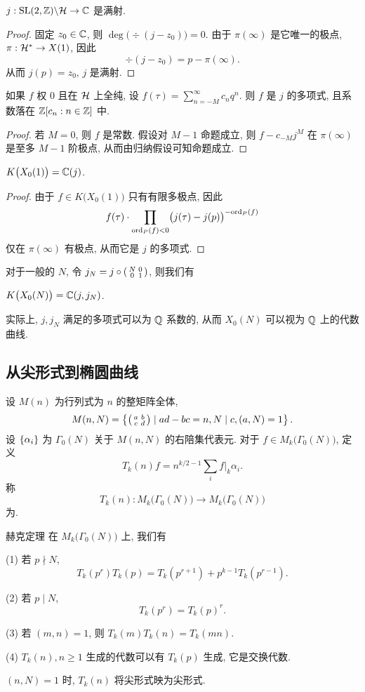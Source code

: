 \begin{proposition}{}{}
$j:{\mathrm{SL}}(2,{\mathbb{Z}})\backslash {\mathcal{H}}\to {\mathbb{C}}$ 是满射.
\end{proposition}
\begin{proof}
固定 $z_0\in{\mathbb{C}}$, 则 $\deg\bigl(\div(j-z_0)\bigr)=0$. 由于 $\pi(\infty)$ 是它唯一的极点, $\pi:{\mathcal{H}}^*\to X(1)$, 因此
  \[\div(j-z_0)=p-\pi(\infty).\]
从而 $j(p)=z_0$, $j$ 是满射.
\end{proof}

\begin{lemma}{}{}
如果 $f$ 权 $0$ 且在 ${\mathcal{H}}$ 上全纯, 设 $f(\tau)=\sum_{n=-M}^\infty c_nq^n$. 则 $f$ 是 $j$ 的多项式, 且系数落在 ${\mathbb{Z}}[c_n:n\in{\mathbb{Z}}]$ 中. 
\end{lemma}
\begin{proof}
若 $M=0$, 则 $f$ 是常数. 假设对 $M-1$ 命题成立, 则 $f-c_{-M}j^M$ 在 $\pi(\infty)$ 是至多 $M-1$ 阶极点, 从而由归纳假设可知命题成立.
\end{proof}

\begin{theorem}{}{}
$K\bigl(X_0(1)\bigr)={\mathbb{C}}(j)$.
\end{theorem}
\begin{proof}
由于 $f\in K\bigl(X_0(1)\bigr)$ 只有有限多极点, 因此
  \[f(\tau)\cdot \prod_{{\mathrm{ord}}_P(f)<0}\bigl(j(\tau)-j(p)\bigr)^{-{\mathrm{ord}}_P(f)}\]
仅在 $\pi(\infty)$ 有极点, 从而它是 $j$ 的多项式.
\end{proof}

对于一般的 $N$, 令 $j_N=j\circ \left(\begin{smallmatrix}N & 0 \\ 0 & 1\end{smallmatrix}\right)$, 则我们有
\begin{theorem}{}{}
$K\bigl(X_0(N)\bigr)={\mathbb{C}}(j,j_N)$.
\end{theorem}
实际上, $j,j_N$ 满足的多项式可以为 ${\mathbb{Q}}$ 系数的, 从而 $X_0(N)$ 可以视为 ${\mathbb{Q}}$ 上的代数曲线.


\subsection{从尖形式到椭圆曲线}
设 $M(n)$ 为行列式为 $n$ 的整矩阵全体, 
  \[M(n,N)=\left\{\left(\begin{smallmatrix}a & b \\ c & d\end{smallmatrix}\right)\mid ad-bc=n,N\mid c,(a,N)=1\right\}.\]
设 $\left\{\alpha_i\right\}$ 为 $\Gamma_0(N)$ 关于 $M(n,N)$ 的右陪集代表元. 对于 $f\in M_k\bigl(\Gamma_0(N)\bigr)$, 定义
  \[T_k(n)f=n^{k/2-1}\sum_i f|_k \alpha_i.\]
称
  \[T_k(n):M_k\bigl(\Gamma_0(N)\bigr)\to M_k\bigl(\Gamma_0(N)\bigr)\]
为.

\begin{theorem}{赫克定理}{}
在 $M_k\bigl(\Gamma_0(N)\bigr)$ 上, 我们有

(1) 若 $p\nmid N$, 
  \[T_k(p^r)T_k(p)=T_k(p^{r+1})+p^{k-1}T_k(p^{r-1}).\]

(2) 若 $p\mid N$, 
  \[T_k(p^r)=T_k(p)^r.\]

(3) 若 $(m,n)=1$, 则 $T_k(m)T_k(n)=T_k(mn)$.

(4) $T_k(n),n\ge 1$ 生成的代数可以有 $T_k(p)$ 生成, 它是交换代数.

$(n,N)=1$ 时, $T_k(n)$ 将尖形式映为尖形式.
\end{theorem}

